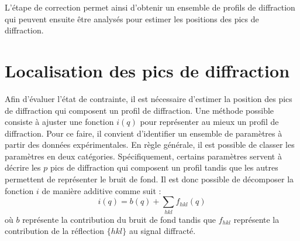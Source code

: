\documentclass[french,a4paper]{report}
\begin{document}
L'étape de correction permet ainsi d'obtenir un ensemble de profils de diffraction qui peuvent ensuite être analysés pour estimer les positions des pics de diffraction.

\section{Localisation des pics de diffraction}

Afin d'évaluer l'état de contrainte, il est nécessaire d'estimer la position des pics de diffraction qui composent un profil de diffraction. Une méthode possible consiste à ajuster une fonction $i(q )$ pour représenter au mieux un profil de diffraction. Pour ce faire, il convient d'identifier un ensemble de paramètres à partir des données expérimentales. En règle générale, il est possible de classer les paramètres en deux catégories. Spécifiquement, certains paramètres servent à décrire les $p$ pics de diffraction qui composent un profil tandis que les autres permettent de représenter le bruit de fond. Il est donc possible de décomposer la fonction $i$ de manière additive comme suit :
\begin{equation}
 i \left(q \right) = b \left(q  \right) + \sum_{hkl} f_{hkl} \left(q  \right)
\end{equation}
où $b$ représente la contribution du bruit de fond tandis que $f_{hkl}$ représente la contribution de la réflection $\{ hkl \}$ au signal diffracté.
\end{document}
